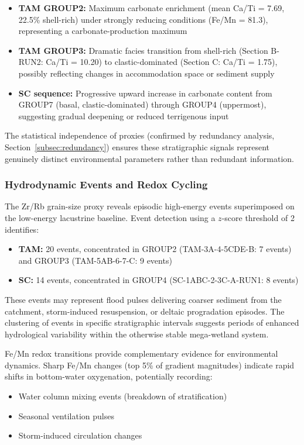 \documentclass[11pt,a4paper]{article}
\begin{document}
\begin{itemize}
    \item \textbf{TAM GROUP2:} Maximum carbonate enrichment (mean Ca/Ti = 7.69, 22.5\% shell-rich) under strongly reducing conditions (Fe/Mn = 81.3), representing a carbonate-production maximum

    \item \textbf{TAM GROUP3:} Dramatic facies transition from shell-rich (Section B-RUN2: Ca/Ti = 10.20) to clastic-dominated (Section C: Ca/Ti = 1.75), possibly reflecting changes in accommodation space or sediment supply

    \item \textbf{SC sequence:} Progressive upward increase in carbonate content from GROUP7 (basal, clastic-dominated) through GROUP4 (uppermost), suggesting gradual deepening or reduced terrigenous input
\end{itemize}

The statistical independence of proxies (confirmed by redundancy analysis, Section~\ref{subsec:redundancy}) ensures these stratigraphic signals represent genuinely distinct environmental parameters rather than redundant information.

\subsubsection{Hydrodynamic Events and Redox Cycling}

The Zr/Rb grain-size proxy reveals episodic high-energy events superimposed on the low-energy lacustrine baseline. Event detection using a $z$-score threshold of 2 identifies:

\begin{itemize}
    \item \textbf{TAM:} 20 events, concentrated in GROUP2 (TAM-3A-4-5CDE-B: 7 events) and GROUP3 (TAM-5AB-6-7-C: 9 events)
    \item \textbf{SC:} 14 events, concentrated in GROUP4 (SC-1ABC-2-3C-A-RUN1: 8 events)
\end{itemize}

These events may represent flood pulses delivering coarser sediment from the catchment, storm-induced resuspension, or deltaic progradation episodes. The clustering of events in specific stratigraphic intervals suggests periods of enhanced hydrological variability within the otherwise stable mega-wetland system.

Fe/Mn redox transitions provide complementary evidence for environmental dynamics. Sharp Fe/Mn changes (top 5\% of gradient magnitudes) indicate rapid shifts in bottom-water oxygenation, potentially recording:
\begin{itemize}
    \item Water column mixing events (breakdown of stratification)
    \item Seasonal ventilation pulses
    \item Storm-induced circulation changes
\end{itemize}
\end{document}
